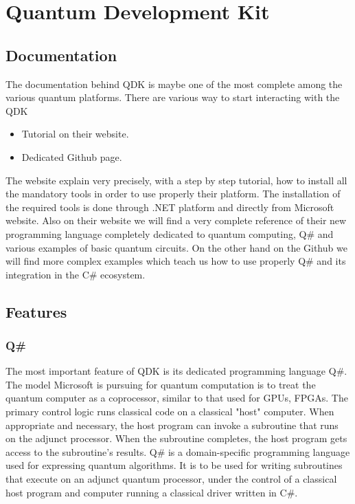 \documentclass[main.tex]{subfiles}
\begin{document}
\section{Quantum Development Kit}
	\subsection{Documentation}
	The documentation behind QDK is maybe one of the most complete among the various quantum platforms. There are various way to start interacting with the QDK
	\begin{itemize}
		\item Tutorial on their website.
		\item Dedicated Github page.
	\end{itemize}
	The website explain very precisely, with a step by step tutorial, how to install all the mandatory tools in order to use properly their platform. The installation of the required tools is done through .NET platform and directly from Microsoft website.
	 Also on their website we will find a very complete reference of their new programming language completely dedicated to quantum computing, Q\# and various examples of basic quantum circuits.
	 On the other hand on the Github we will find more complex examples which teach us how to use properly Q\# and its integration in the C\# ecosystem.
	
	\subsection{Features}
	\subsubsection{Q\#}	
	The most important feature of QDK is its dedicated programming language Q\#. 
	The model Microsoft is pursuing for quantum computation is to treat the quantum computer as a coprocessor, similar to that used for GPUs, FPGAs. The primary control logic runs classical code on a classical "host" computer. When appropriate and necessary, the host program can invoke a subroutine that runs on the adjunct processor. When the subroutine completes, the host program gets access to the subroutine's results.
	Q\# is a domain-specific programming language used for expressing quantum algorithms. It is to be used for writing subroutines that execute on an adjunct quantum processor, under the control of a classical host program and computer running a classical driver written in C\#.
	
\end{document}
